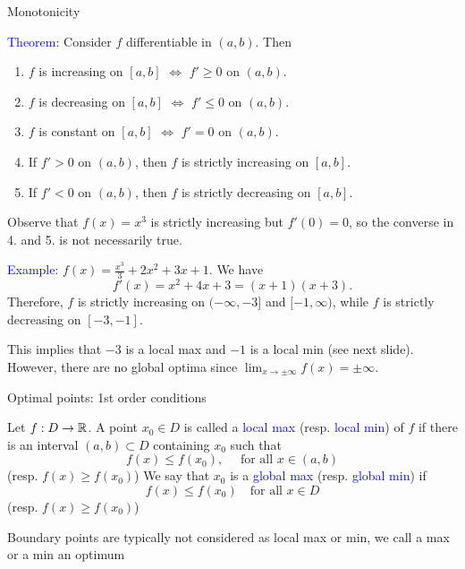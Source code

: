 \documentclass[11pt,aspectratio=169]{beamer}
\begin{document}
\begin{frame}{Monotonicity}

\textcolor{blue}{Theorem:} Consider $f$ differentiable in $(a,b)$. Then 
\begin{enumerate}
\item $f$ is increasing on $[a,b]$
$\Longleftrightarrow$  $f'\geq 0$ on $(a,b)$.
\item $f$ is decreasing on $[a,b]$ 
$\Longleftrightarrow$ $f'\leq 0$ on $(a,b)$. 
\item $f$ is constant on $[a,b]$ $\Longleftrightarrow$ $f'=0$ on $(a,b)$.
\item If $f'>0$ on $(a,b)$, then $f$ is strictly increasing on $[a,b]$.
\item If $f'<0$ on $(a,b)$, then $f$ is strictly decreasing on $[a,b]$.
\end{enumerate}
\begin{tiny}Observe that $f(x)=x^3$ is strictly increasing but $f'(0)=0$, so the converse in 4. and 5. is not necessarily true.\end{tiny}
\vskip 12pt
\textcolor{blue}{Example:} $f(x)=\frac{x^3}{3}+2x^2+3x+1.$ We have
$$
f'(x)=x^2+4x+3=(x+1)(x+3).
$$
Therefore, $f$ is strictly increasing on $(-\infty, -3]$ and $[-1, \infty)$, while $f$ is strictly decreasing on $[-3,-1]$.

\begin{tiny}This implies that $-3$ is a local max and $-1$ is a local min (see next slide). 
However, there are no global optima since $\lim_{ x \rightarrow \pm \infty} f(x)=\pm \infty$.  \end{tiny}
\end{frame}








\begin{frame}{Optimal points: 1st order conditions}

Let $f:D \rightarrow \mathbb R$. A point $x_0 \in D$ is called a \textcolor{blue}{local max} (resp. \textcolor{blue}{local min}) of $f$ if there is an interval $(a,b) \subset D$ containing $x_0$ such that $$f(x)\leq f(x_0), \quad \text{ for all } x \in (a,b)$$ (resp. $f(x) \geq f(x_0)$)
\vskip 12pt
We say that $x_0$ is a \textcolor{blue}{global max} (resp. \textcolor{blue}{global min}) if $$f(x)\leq f(x_0)\quad \text{for all } x \in D$$ (resp. $f(x) \geq f(x_0)$) 

\begin{tiny} Boundary points are typically not considered as local max or min, we call a max or a min an optimum  \end{tiny}

 \end{frame}
\end{document}
